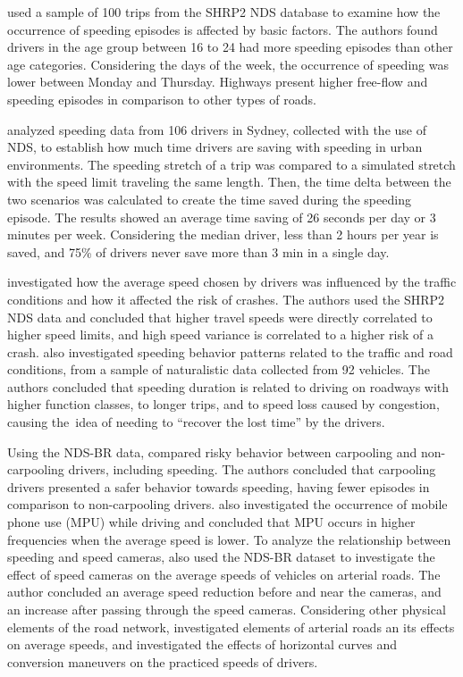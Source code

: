 \textcite{Richard2020} used a sample of 100 trips from the SHRP2 NDS database to examine how the occurrence of speeding episodes is affected by basic factors. The authors found drivers in the age group between 16 to 24 had more speeding episodes than other age categories. Considering the days of the week, the occurrence of speeding was lower between Monday and Thursday. Highways present higher free-flow and speeding episodes in comparison to other types of roads. 

\textcite{Ellison2015} analyzed speeding data from 106 drivers in Sydney, collected with the use of NDS, to establish how much time drivers are saving with speeding in urban environments. The speeding stretch of a trip was compared to a simulated stretch with the speed limit traveling the same length. Then, the time delta between the two scenarios was calculated to create the time saved during the speeding episode. The results showed an average time saving of 26 seconds per day or 3 minutes per week. Considering the median driver, less than 2 hours per year is saved, and 75\% of drivers never save more than 3 min in a single day. 

\textcite{Hamzeie2017} investigated how the average speed chosen by drivers was influenced by the traffic conditions and how it affected the risk of crashes. The authors used the SHRP2 NDS data and concluded that higher travel speeds were directly correlated to higher speed limits, and high speed variance is correlated to a higher risk of a crash. \textcite{Kong2020} also investigated speeding behavior patterns related to the traffic and road conditions, from a sample of naturalistic data collected from 92 vehicles. The authors concluded that speeding duration is related to driving on roadways with higher function classes, to longer trips, and to speed loss caused by congestion, causing the\ idea of needing to ``recover the lost time'' by the drivers.

Using the NDS-BR data, \textcite{Bastos2021} compared risky behavior between carpooling and non-carpooling drivers, including speeding. The authors concluded that carpooling drivers presented a safer behavior towards speeding, having fewer episodes in comparison to non-carpooling drivers. \textcite{Bastos2020a} also investigated the occurrence of mobile phone use (MPU) while driving and concluded that MPU occurs in higher frequencies when the average speed is lower. To analyze the relationship between speeding and speed cameras, \textcite{Amancio2021} also used the NDS-BR dataset to investigate the effect of speed cameras on the average speeds of vehicles on arterial roads. The author concluded an average speed reduction before and near the cameras, and an increase after passing through the speed cameras. Considering other physical elements of the road network, \textcite{suguinoshitaFATORESDETERMINANTESPARA2020} investigated elements of arterial roads an its effects on average speeds, and \textcite{szeligaIMPACTOCURVASHORIZONTAIS2020,szeligaAnaliseVelocidadePraticada2021} investigated the effects of horizontal curves and conversion maneuvers on the practiced speeds of drivers.

